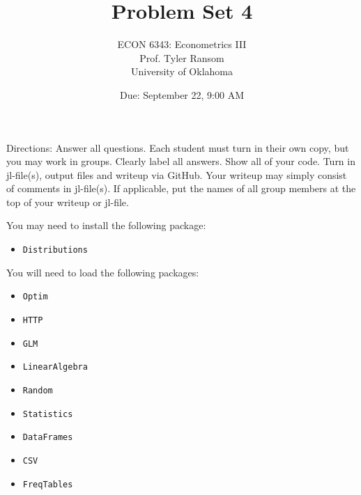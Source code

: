 \documentclass[12pt,english]{article}
\begin{document}
\title{Problem Set 4}
\author{ECON 6343: Econometrics III\\
Prof. Tyler Ransom\\
University of Oklahoma}
\date{Due: September 22, 9:00 AM}

\maketitle
Directions: Answer all questions. Each student must turn in their own copy, but you may work in groups. Clearly label all answers. Show all of your code. Turn in jl-file(s), output files and writeup via GitHub. Your writeup may simply consist of comments in jl-file(s). If applicable, put the names of all group members at the top of your writeup or jl-file.

You may need to install the following package:
\begin{itemize}
    \item[~] \texttt{Distributions}
\end{itemize}

You will need to load the following packages:
\begin{itemize}
    \item[~] \texttt{Optim} 
    \item[~] \texttt{HTTP} 
    \item[~] \texttt{GLM} 
    \item[~] \texttt{LinearAlgebra} 
    \item[~] \texttt{Random} 
    \item[~] \texttt{Statistics} 
    \item[~] \texttt{DataFrames} 
    \item[~] \texttt{CSV} 
    \item[~] \texttt{FreqTables}
\end{itemize}
\end{document}
